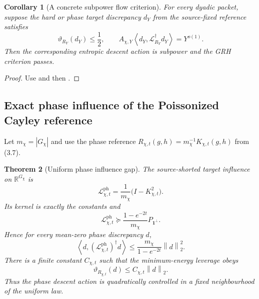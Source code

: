 \documentclass[11pt]{article}
\newtheorem{theorem}{Theorem}[section]
\newtheorem{corollary}[theorem]{Corollary}
\theoremstyle{definition}
\theoremstyle{remark}
\newcommand{\R}{\mathbb R}
\newcommand{\one}{\mathbf 1}
\newcommand{\norm}[1]{\left\lVert#1\right\rVert}
\newcommand{\ip}[2]{\left\langle#1,#2\right\rangle}
\newcommand{\Phase}{\mathrm{ph}}
\begin{document}
\begin{corollary}[A concrete subpower flow criterion]
\label{cor:influence-GRH}
For every dyadic packet, suppose the hard or phase target discrepancy $d_Y$
from the source-fixed reference satisfies
\[
 \vartheta_{R_Y}(d_Y)\le\frac12,
 \qquad
 A_{\chi,Y}\ip{d_Y}{\mathcal L_{R_Y}^\dagger d_Y}=Y^{o(1)}.
 \tag{6.14}
\]
Then the corresponding entropic descent action is subpower and the GRH
criterion passes.
\end{corollary}

\begin{proof}
Use  and then
.
\end{proof}

\subsection{Exact phase influence of the Poissonized Cayley reference}

Let $m_\chi=|G_\chi|$ and use the phase reference
$R_{\chi,t}(g,h)=m_\chi^{-1}K_{\chi,t}(g,h)$ from
\textup{(3.7)}.

\begin{theorem}[Uniform phase influence gap]
\label{thm:phase-influence-gap}
The source-shorted target influence on $\R^{G_\chi}$ is
\[
 \boxed{
 \mathcal L_{\chi,t}^{\Phase}
 =\frac1{m_\chi}\bigl(I-K_{\chi,t}^2\bigr).}
 \tag{6.15}
\]
Its kernel is exactly the constants and
\[
 \boxed{
 \mathcal L_{\chi,t}^{\Phase}
 \succeq
 \frac{1-e^{-2t}}{m_\chi}P_{\one^\perp}.}
 \tag{6.16}
\]
Hence for every mean-zero phase discrepancy $d$,
\[
 \boxed{
 \ip d{(\mathcal L_{\chi,t}^{\Phase})^\dagger d}
 \le\frac{m_\chi}{1-e^{-2t}}\norm d_2^2.}
 \tag{6.17}
\]
There is a finite constant $C_{\chi,t}$ such that the minimum-energy leverage
obeys
\[
 \boxed{
 \vartheta_{R_{\chi,t}}(d)
 \le C_{\chi,t}\norm d_2.}
 \tag{6.18}
\]
Thus the phase descent action is quadratically controlled in a fixed
neighbourhood of the uniform law.
\end{theorem}
\end{document}
